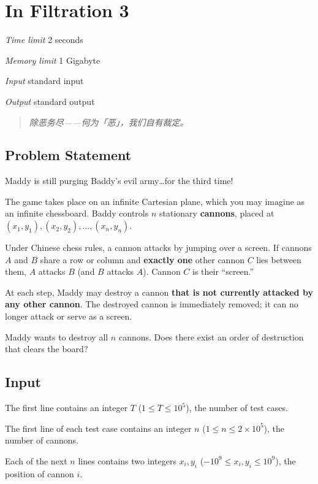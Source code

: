 \section[L. In Filtration 3]{ In Filtration 3}

\textit{Time limit}   2 seconds

\textit{Memory limit} 1 Gigabyte

\textit{Input} \qquad standard input

\textit{Output} \qquad standard output


\begin{quote}
	\textit{除恶务尽——何为「恶」，我们自有裁定。}
\end{quote}

\subsection{Problem Statement}

Maddy is still purging Baddy's evil army\ldots for the third time!

The game takes place on an infinite Cartesian plane, which you may imagine as an infinite chessboard. Baddy controls $n$ stationary \textbf{cannons}, placed at $(x_1,y_1),(x_2,y_2),\ldots,(x_n,y_n)$.

Under Chinese chess rules, a cannon attacks by jumping over a screen. If cannons $A$ and $B$ share a row or column and \textbf{exactly one} other cannon $C$ lies between them, $A$ attacks $B$ (and $B$ attacks $A$). Cannon $C$ is their ``screen.''

At each step, Maddy may destroy a cannon \textbf{that is not currently attacked by any other cannon}. The destroyed cannon is immediately removed; it can no longer attack or serve as a screen.

Maddy wants to destroy all $n$ cannons. Does there exist an order of destruction that clears the board?

\subsection{Input}

The first line contains an integer $T$ ($1 \le T \le 10^5$), the number of test cases.

The first line of each test case contains an integer $n$ ($1 \le n \le 2 \times 10^5$), the number of cannons.

Each of the next $n$ lines contains two integers $x_i,y_i$ ($-10^9 \le x_i,y_i \le 10^9$), the position of cannon $i$.

